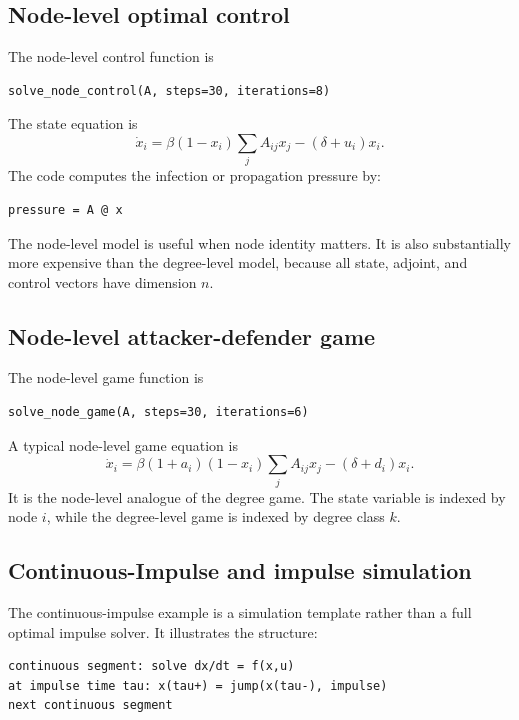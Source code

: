 \documentclass[11pt,a4paper]{article}
\begin{document}
\subsection{Node-level optimal control}

The node-level control function is

\begin{lstlisting}[style=py]
solve_node_control(A, steps=30, iterations=8)
\end{lstlisting}

The state equation is
\[
  \dot{x}_i
  =\beta(1-x_i)\sum_j A_{ij}x_j
  -(\delta+u_i)x_i.
\]
The code computes the infection or propagation pressure by:

\begin{lstlisting}[style=py]
pressure = A @ x
\end{lstlisting}

The node-level model is useful when node identity matters. It is also substantially more expensive than the degree-level model, because all state, adjoint, and control vectors have dimension \(n\).

\subsection{Node-level attacker-defender game}

The node-level game function is

\begin{lstlisting}[style=py]
solve_node_game(A, steps=30, iterations=6)
\end{lstlisting}

A typical node-level game equation is
\[
  \dot{x}_i
  =\beta(1+a_i)(1-x_i)\sum_jA_{ij}x_j
  -(\delta+d_i)x_i.
\]
It is the node-level analogue of the degree game. The state variable is indexed by node \(i\), while the degree-level game is indexed by degree class \(k\).

\subsection{Continuous-Impulse and impulse simulation}

The continuous-impulse example is a simulation template rather than a full optimal impulse solver. It illustrates the structure:

\begin{lstlisting}[style=text]
continuous segment: solve dx/dt = f(x,u)
at impulse time tau: x(tau+) = jump(x(tau-), impulse)
next continuous segment
\end{lstlisting}
\end{document}

